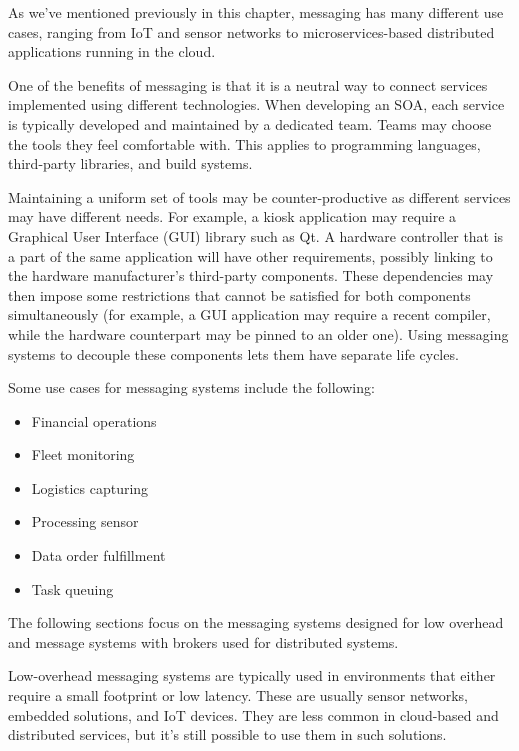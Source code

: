
As we've mentioned previously in this chapter, messaging has many different use cases, ranging from IoT and sensor networks to microservices-based distributed applications running in the cloud.

One of the benefits of messaging is that it is a neutral way to connect services implemented using different technologies. When developing an SOA, each service is typically developed and maintained by a dedicated team. Teams may choose the tools they feel comfortable with. This applies to programming languages, third-party libraries, and build systems.

Maintaining a uniform set of tools may be counter-productive as different services may have different needs. For example, a kiosk application may require a Graphical User Interface (GUI) library such as Qt. A hardware controller that is a part of the same application will have other requirements, possibly linking to the hardware manufacturer's third-party components. These dependencies may then impose some restrictions that cannot be satisfied for both components simultaneously (for example, a GUI application may require a recent compiler, while the hardware counterpart may be pinned to an older one). Using messaging systems to decouple these components lets them have separate life cycles.

Some use cases for messaging systems include the following:

\begin{itemize}
\item 
Financial operations

\item 
Fleet monitoring

\item 
Logistics capturing

\item 
Processing sensor

\item 
Data order fulfillment

\item 
Task queuing
\end{itemize}

The following sections focus on the messaging systems designed for low overhead and message systems with brokers used for distributed systems.


Low-overhead messaging systems are typically used in environments that either require a small footprint or low latency. These are usually sensor networks, embedded solutions, and IoT devices. They are less common in cloud-based and distributed services, but it's still possible to use them in such solutions.

